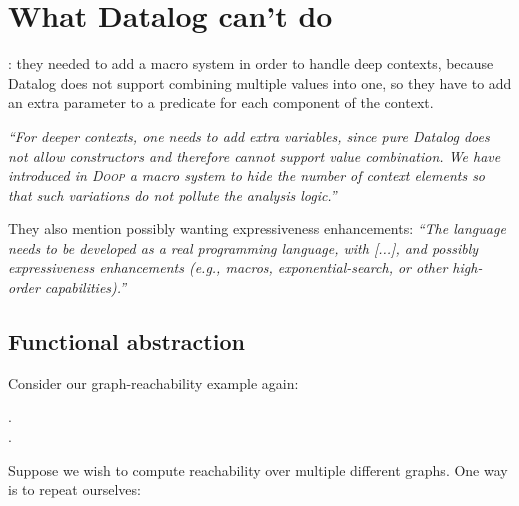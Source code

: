 
\section{What Datalog can't do}


\cite{DBLP:conf/datalog/SmaragdakisB10}: they needed to add a macro system in
order to handle deep contexts, because Datalog does not support combining
multiple values into one, so they have to add an extra parameter to a predicate
for each component of the context.

\emph{``For deeper contexts, one needs to add extra variables, since pure
  Datalog does not allow constructors and therefore cannot support value
  combination. We have introduced in \textsc{Doop} a macro system to hide the
  number of context elements so that such variations do not pollute the analysis
  logic.''}

They also mention possibly wanting expressiveness enhancements: \emph{``The
  language needs to be developed as a real programming language, with [...], and
  possibly expressiveness enhancements (e.g., macros, exponential-search, or
  other high-order capabilities).''}


\subsection{Functional abstraction}

Consider our graph-reachability example again:

\begin{datalog}
  .\\
   \gets {} \conj {}.
\end{datalog}

\noindent
Suppose we wish to compute reachability over multiple different graphs. One way is to repeat ourselves:

